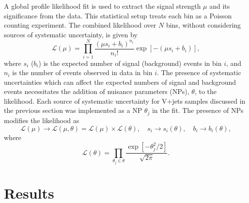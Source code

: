 A global profile likelihood fit is used to extract the signal strength $\mu$ and its significance from the data. This statistical setup treats each bin as a Poisson counting experiment. The combined likelihood over $N$ bins, without considering sources of systematic uncertainty, is given by
%
\begin{equation}
    \mathcal{L}(\mu) = \prod_{i=1}^N \frac{(\mu s_i + b_i)^{n_i}}{n_i!} \exp \left[ - (\mu s_i + b_i) \right],
\end{equation}
%
where $s_i$ ($b_i$) is the expected number of signal (background) events in bin $i$, and $n_i$ is the number of events observed in data in bin $i$. The presence of systematic uncertainties which can affect the expected numbers of signal and background events necessitates the addition of nuisance parameters (NPs), $\theta$, to the likelihood. Each source of systematic uncertainty for V+jets samples discussed in the previous section was implemented as a NP $\theta_j$ in the fit. The presence of NPs modifies the likelihood as 
%
\begin{equation}
    \mathcal{L}(\mu) \rightarrow \mathcal{L}(\mu, \theta) = \mathcal{L}(\mu) \times \mathcal{L}(\theta) , \quad s_i \rightarrow s_i(\theta) , \quad b_i \rightarrow b_i(\theta),
\end{equation}
%
where
%
\begin{equation}
    \mathcal{L}(\theta) = \prod_{\theta_j \in \theta} \frac{\exp\left[{-\theta_j^2/2}\right]}{\sqrt{2\pi}}.
\end{equation}
%


\section{Results}\label{sec:vhbb_results}

